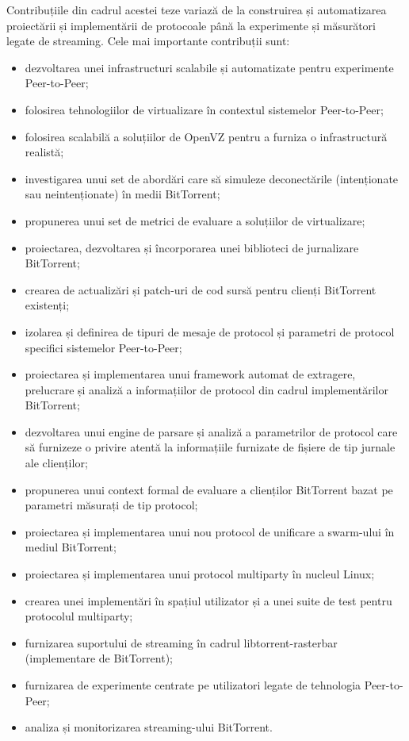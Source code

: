 Contribuțiile din cadrul acestei teze variază de la construirea și
automatizarea proiectării și implementării de protocoale până la experimente
și măsurători legate de streaming. Cele mai importante contribuții sunt:

\begin{itemize}
  \item dezvoltarea unei infrastructuri scalabile și automatizate pentru
  experimente Peer-to-Peer;
  \item folosirea tehnologiilor de virtualizare în contextul sistemelor
  Peer-to-Peer;
  \item folosirea scalabilă a soluțiilor de OpenVZ pentru a furniza o
  infrastructură realistă;
  \item investigarea unui set de abordări care să simuleze deconectările
  (intenționate sau neintenționate) în medii BitTorrent;
  \item propunerea unui set de metrici de evaluare a soluțiilor de
  virtualizare;
  \item proiectarea, dezvoltarea și încorporarea unei biblioteci de
  jurnalizare BitTorrent;
  \item crearea de actualizări și patch-uri de cod sursă pentru clienți
  BitTorrent existenți;
  \item izolarea și definirea de tipuri de mesaje de protocol și parametri de
  protocol specifici sistemelor Peer-to-Peer;
  \item proiectarea și implementarea unui framework automat de extragere,
  prelucrare și analiză a informațiilor de protocol din cadrul implementărilor
  BitTorrent;
  \item dezvoltarea unui engine de parsare și analiză a parametrilor de
  protocol care să furnizeze o privire atentă la informațiile furnizate de
  fișiere de tip jurnale ale clienților;
  \item propunerea unui context formal de evaluare a clienților BitTorrent
  bazat pe parametri măsurați de tip protocol;
  \item proiectarea și implementarea unui nou protocol de unificare a
  swarm-ului în mediul BitTorrent;
  \item proiectarea și implementarea unui protocol multiparty în nucleul
  Linux;
  \item crearea unei implementări în spațiul utilizator și a unei suite de
  test pentru protocolul multiparty;
  \item furnizarea suportului de streaming în cadrul libtorrent-rasterbar
  (implementare de BitTorrent);
  \item furnizarea de experimente centrate pe utilizatori legate de tehnologia
  Peer-to-Peer;
  \item analiza și monitorizarea streaming-ului BitTorrent.
\end{itemize}

